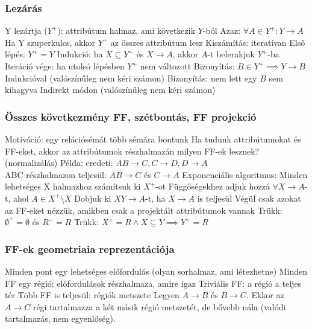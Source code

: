 \documentclass[12pt,a4paper]{article}
\begin{document}
\pagebreak

\subsubsection{Lezárás}

\begin{outline}
	\1 Y lezártja ($Y^+$): attribútum halmaz, ami következik $Y$-ból
		\2 Azaz: $\forall A \in Y^+: Y \to A$
	\1 Ha Y szuperkulcs, akkor $Y^+$ az összes attribútum lesz
	\1 Kiszámítás: iteratívan
		\2 Első lépés: $Y^+ = Y$
		\2 Indukció: ha $X \subseteq Y^+$ és $X \to A$, akkor $A$-t belerakjuk $Y^+$-ba
		\2 Iteráció vége: ha utolsó lépésben $Y^+$ nem változott
	\1 Bizonyítás: $B \in Y^+ \implies Y \to B$
		\2 Indukcióval (valószínűleg nem kéri számon)
	\1 Bizonyítás: nem lett egy $B$ sem kihagyva
		\2 Indirekt módon (valószínűleg nem kéri számon)
\end{outline}

\subsubsection{Összes következmény FF, szétbontás, FF projekció}

\begin{outline}
	\1 Motiváció: egy relációsémát több sémára bontunk
	\1 Ha tudunk attribútumokat és FF-eket, akkor az attribútumok részhalmazán milyen FF-ek lesznek? (normalizálás)
	\1 Példa: eredeti: $AB \to C, C \to D, D \to A$\\
	ABC részhalmazon teljesül: $AB \to C$ és $C \to A$
	\1 Exponenciális algoritmus:
		\2 Minden lehetséges X halmazhoz számítsuk ki $X^+$-ot
		\2 Függőségekhez adjuk hozzá $\forall X \to A$-t, ahol $A \in X^+ \setminus X$
		\2 Dobjuk ki $XY \to A$-t, ha $X \to A$ is teljesül
		\2 Végül csak azokat az FF-eket nézzük, amikben csak a projektált attribútumok vannak
		\2 Trükk: $\emptyset^+ = \emptyset$ és $R^+ = R$
		\2 Trükk: $X^+ = R \wedge X \subseteq Y \implies Y^+ = R$
\end{outline}

\pagebreak

\subsubsection{FF-ek geometriaia reprezentációja}

\begin{outline}
	\1 Minden pont egy lehetséges előfordulás (olyan sorhalmaz, ami létezhetne)
	\1 Minden FF egy régió: előfordulások részhalmaza, amire igaz
	\1 Triviális FF: a régió a teljes tér
	\1 Több FF is teljesül: régiók metszete
	\1 Legyen $A \to B$ és $B \to C$. Ekkor az $A \to C$ régi tartalmazza a két másik régió metszetét, de bővebb nála (valódi tartalmazás, nem egyenlőség).
\end{outline}
\end{document}
